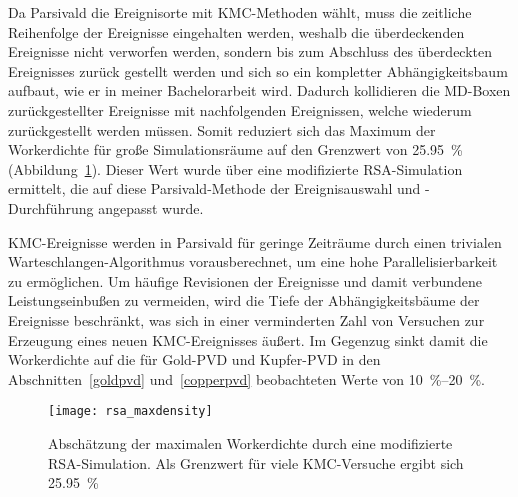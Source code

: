 Da Parsivald die Ereignisorte mit KMC-Methoden wählt, muss die zeitliche Reihenfolge der Ereignisse eingehalten werden, weshalb die überdeckenden Ereignisse nicht verworfen werden, sondern bis zum Abschluss des überdeckten Ereignisses zurück gestellt werden und sich so ein kompletter Abhängigkeitsbaum aufbaut, wie er in meiner Bachelorarbeit wird\cite{lorenz_entwicklung_2012}.
Dadurch kollidieren die MD-Boxen zurückgestellter Ereignisse mit nachfolgenden Ereignissen, welche wiederum zurückgestellt werden müssen.
Somit reduziert sich das Maximum der Workerdichte für große Simulationsräume auf den Grenzwert von \SI{25.95}{\percent} (Abbildung~\ref{fig:rsamaxdensity}).
Dieser Wert wurde über eine modifizierte RSA-Simulation ermittelt, die auf diese Parsivald-Methode der Ereignisauswahl und -Durchführung angepasst wurde.

KMC-Ereignisse werden in Parsivald für geringe Zeiträume durch einen trivialen Warteschlangen-Algorithmus vorausberechnet, um eine hohe Parallelisierbarkeit zu ermöglichen.
Um häufige Revisionen der Ereignisse und damit verbundene Leistungseinbußen zu vermeiden, wird die Tiefe der Abhängigkeitsbäume der Ereignisse beschränkt, was sich in einer verminderten Zahl von Versuchen zur Erzeugung eines neuen KMC-Ereignisses äußert.
Im Gegenzug sinkt damit die Workerdichte auf die für Gold-PVD und Kupfer-PVD in den Abschnitten~\ref{goldpvd} und~\ref{copperpvd} beobachteten Werte von \SIrange{10}{20}{\percent}.

\vspace{2em}

\begin{figure}[h]
  \centering
  \texttt{[image: rsa\_maxdensity]}

  \caption[Abschätzung der maximalen Workerdichte ]{
    Abschätzung der maximalen Workerdichte durch eine modifizierte RSA-Simulation.
    Als Grenzwert für viele KMC-Versuche ergibt sich \SI{25.95}{\percent}
  }
  \label{fig:rsamaxdensity}

\end{figure}
